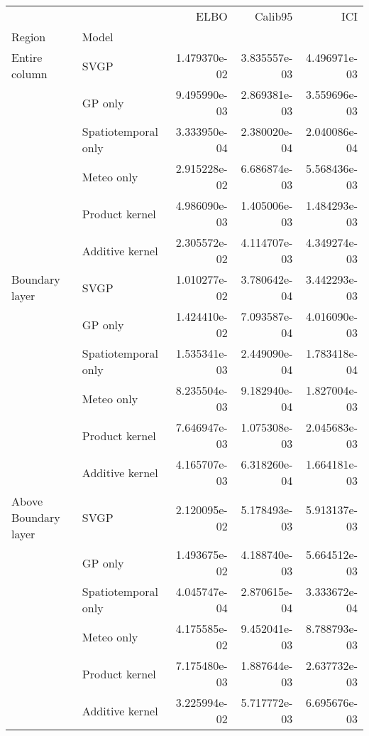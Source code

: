 \begin{tabular}{llrrr}
\toprule
                     &                 &         ELBO &      Calib95 &          ICI \\
Region & Model &              &              &              \\
\midrule
Entire column & SVGP & 1.479370e-02 & 3.835557e-03 & 4.496971e-03 \\
                     & GP only & 9.495990e-03 & 2.869381e-03 & 3.559696e-03 \\
                     & Spatiotemporal only & 3.333950e-04 & 2.380020e-04 & 2.040086e-04 \\
                     & Meteo only & 2.915228e-02 & 6.686874e-03 & 5.568436e-03 \\
                     & Product kernel & 4.986090e-03 & 1.405006e-03 & 1.484293e-03 \\
                     & Additive kernel & 2.305572e-02 & 4.114707e-03 & 4.349274e-03 \\
Boundary layer & SVGP & 1.010277e-02 & 3.780642e-04 & 3.442293e-03 \\
                     & GP only & 1.424410e-02 & 7.093587e-04 & 4.016090e-03 \\
                     & Spatiotemporal only & 1.535341e-03 & 2.449090e-04 & 1.783418e-04 \\
                     & Meteo only & 8.235504e-03 & 9.182940e-04 & 1.827004e-03 \\
                     & Product kernel & 7.646947e-03 & 1.075308e-03 & 2.045683e-03 \\
                     & Additive kernel & 4.165707e-03 & 6.318260e-04 & 1.664181e-03 \\
Above Boundary layer & SVGP & 2.120095e-02 & 5.178493e-03 & 5.913137e-03 \\
                     & GP only & 1.493675e-02 & 4.188740e-03 & 5.664512e-03 \\
                     & Spatiotemporal only & 4.045747e-04 & 2.870615e-04 & 3.333672e-04 \\
                     & Meteo only & 4.175585e-02 & 9.452041e-03 & 8.788793e-03 \\
                     & Product kernel & 7.175480e-03 & 1.887644e-03 & 2.637732e-03 \\
                     & Additive kernel & 3.225994e-02 & 5.717772e-03 & 6.695676e-03 \\
\bottomrule
\end{tabular}
